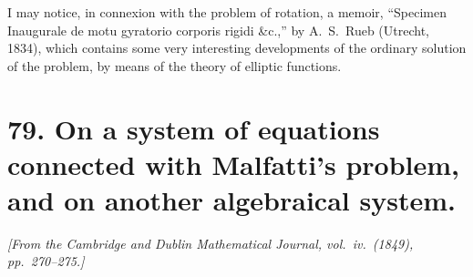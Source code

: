 \documentclass[11pt,a4paper]{article}
\theoremstyle{definition}
\begin{document}
I may notice, in connexion with the problem of rotation, a memoir, ``Specimen Inaugurale de motu gyratorio corporis rigidi \&c.,'' by A.\ S.\ Rueb (Utrecht, 1834), which contains some very interesting developments of the ordinary solution of the problem, by means of the theory of elliptic functions.



\newpage
\section*{79. On a system of equations connected with Malfatti's problem, and on another algebraical system.}

\begin{flushright}
\textit{[From the Cambridge and Dublin Mathematical Journal, vol.\ iv.\ (1849), pp.\ 270--275.]}
\end{flushright}

\setcounter{page}{465}
\end{document}
